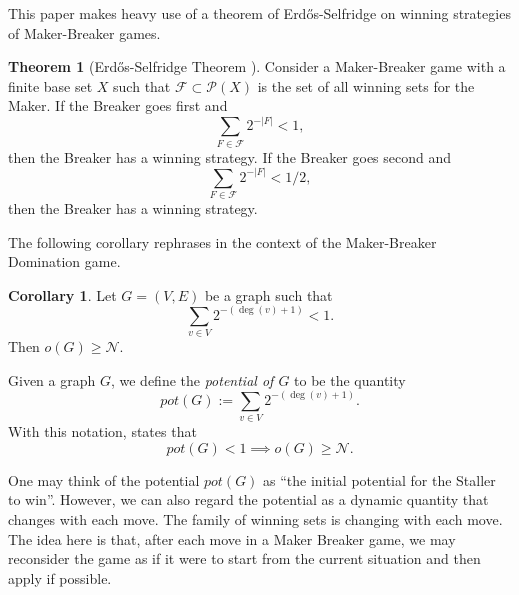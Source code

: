 \documentclass[a4paper,11pt,oneside]{scrartcl}
\theoremstyle{definition}
\newtheorem{theorem}[definition]{Theorem}
\newtheorem{corollary}[definition]{Corollary}
\theoremstyle{remark}
\begin{document}
This paper makes heavy use of a theorem of Erd\H{o}s-Selfridge on winning strategies of Maker-Breaker games.

\begin{theorem}[{Erd\H{o}s-Selfridge Theorem \cite{ErdösSelfridge}}] \label{thm:ES}
    Consider a Maker-Breaker game with a finite base set $X$ such that $\mathcal F \subset \mathcal P(X)$ is the set of all winning sets for the Maker. If the Breaker goes first and 
    \[
        \sum_{F \in \mathcal F} 2^{-|F|} < 1,
    \]
    then the Breaker has a winning strategy. If the Breaker goes second and 
    \[
        \sum_{F \in \mathcal F} 2^{-|F|} < 1/2,
    \]
    then the Breaker has a winning strategy.
\end{theorem}

The following corollary rephrases  in the context of the Maker-Breaker Domination game.

\begin{corollary} \label{cor:ES}
    Let $G=(V,E)$ be a graph such that
    \[
        \sum_{v \in V} 2^{-(\deg(v)+1)} < 1.
    \]
    Then $o(G) \geq \mathcal N$.
\end{corollary}

Given a graph $G$, we define the \textit{potential of $G$} to be the quantity
\[
    pot(G):= \sum_{v \in V} 2^{-(\deg(v)+1)}.
\]
With this notation,  states that
\[
    pot(G) < 1 \implies o(G)\geq \mathcal N.
\]

One may think of the potential $pot(G)$ as “the initial potential for the Staller to win”. However, we can also regard the potential as a dynamic quantity that changes with each move. The family of winning sets is changing with each move. The idea here is that, after each move in a Maker Breaker game, we may reconsider the game as if it were to start from the current situation and then apply  if possible.
\end{document}
